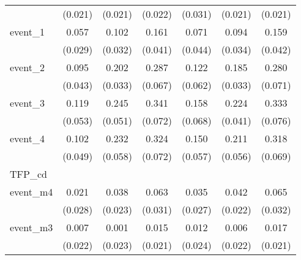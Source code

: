 {\begin{tabular}{l*{6}{c}}
            &     (0.021)         &     (0.021)         &     (0.022)         &     (0.031)         &     (0.021)         &     (0.021)         \\
[1em]
event\_1     &       0.057\sym{*}  &       0.102\sym{**} &       0.161\sym{***}&       0.071         &       0.094\sym{**} &       0.159\sym{***}\\
            &     (0.029)         &     (0.032)         &     (0.041)         &     (0.044)         &     (0.034)         &     (0.042)         \\
[1em]
event\_2     &       0.095\sym{*}  &       0.202\sym{***}&       0.287\sym{***}&       0.122\sym{*}  &       0.185\sym{***}&       0.280\sym{***}\\
            &     (0.043)         &     (0.033)         &     (0.067)         &     (0.062)         &     (0.033)         &     (0.071)         \\
[1em]
event\_3     &       0.119\sym{*}  &       0.245\sym{***}&       0.341\sym{***}&       0.158\sym{*}  &       0.224\sym{***}&       0.333\sym{***}\\
            &     (0.053)         &     (0.051)         &     (0.072)         &     (0.068)         &     (0.041)         &     (0.076)         \\
[1em]
event\_4     &       0.102\sym{*}  &       0.232\sym{***}&       0.324\sym{***}&       0.150\sym{**} &       0.211\sym{***}&       0.318\sym{***}\\
            &     (0.049)         &     (0.058)         &     (0.072)         &     (0.057)         &     (0.056)         &     (0.069)         \\
\hline
TFP\_cd      &                     &                     &                     &                     &                     &                     \\
event\_m4    &       0.021         &       0.038         &       0.063\sym{*}  &       0.035         &       0.042         &       0.065\sym{*}  \\
            &     (0.028)         &     (0.023)         &     (0.031)         &     (0.027)         &     (0.022)         &     (0.032)         \\
[1em]
event\_m3    &       0.007         &       0.001         &       0.015         &       0.012         &       0.006         &       0.017         \\
            &     (0.022)         &     (0.023)         &     (0.021)         &     (0.024)         &     (0.022)         &     (0.021)         \\

\end{tabular}}
